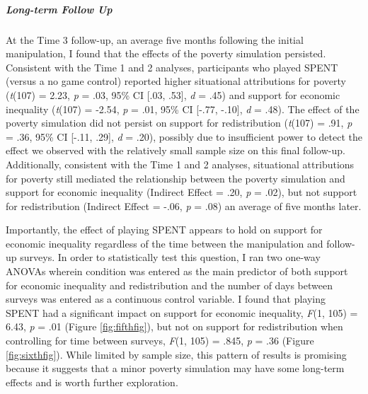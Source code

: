 \documentclass{sfuthesis}
\begin{document}
\subparagraph{Long-term Follow Up} At the Time 3 follow-up, an average five months following the initial manipulation, I found that the effects of the poverty simulation persisted. Consistent with the Time 1 and 2 analyses, participants who played SPENT (versus a no game control) reported higher situational attributions for poverty (\textit{t}(107) = 2.23, \textit{p} = .03, 95\% CI [.03, .53], \textit{d} = .45) and support for economic inequality (\textit{t}(107) = -2.54, \textit{p} = .01, 95\% CI [-.77, -.10], \textit{d} = .48). The effect of the poverty simulation did not persist on support for redistribution (\textit{t}(107) = .91, \textit{p} = .36, 95\% CI [-.11, .29], \textit{d} = .20), possibly due to insufficient power to detect the effect we observed with the relatively small sample size on this final follow-up. Additionally, consistent with the Time 1 and 2 analyses, situational attributions for poverty still mediated the relationship between the poverty simulation and support for economic inequality (Indirect Effect = .20, \textit{p} = .02), but not support for redistribution (Indirect Effect = -.06, \textit{p} = .08) an average of five months later.

Importantly, the effect of playing SPENT appears to hold on support for economic inequality regardless of the time between the manipulation and follow-up surveys. In order to statistically test this question, I ran two one-way ANOVAs wherein condition was entered as the main predictor of both support for economic inequality and redistribution and the number of days between surveys was entered as a continuous control variable. I found that playing SPENT had a significant impact on support for economic inequality, \textit{F}(1, 105) = 6.43, \textit{p} = .01 (Figure \ref{fig:fifthfig}), but not on support for redistribution when controlling for time between surveys, \textit{F}(1, 105) = .845, \textit{p} = .36 (Figure \ref{fig:sixthfig}). While limited by sample size, this pattern of results is promising because it suggests that a minor poverty simulation may have some long-term effects and is worth further exploration.
\end{document}
